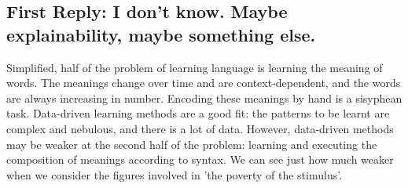 \begin{fullwidth}
\section{\textbf{First Reply:} I don't know. Maybe explainability, maybe something else.}


Simplified, half of the problem of learning language is learning the meaning of words. The meanings change over time and are context-dependent, and the words are always increasing in number. Encoding these meanings by hand is a sisyphean task. Data-driven learning methods are a good fit: the patterns to be learnt are complex and nebulous, and there is a lot of data. However, data-driven methods may be weaker at the second half of the problem: learning and executing the composition of meanings according to syntax. We can see just how much weaker when we consider the figures involved in 'the poverty of the stimulus'.\\


\end{fullwidth}
